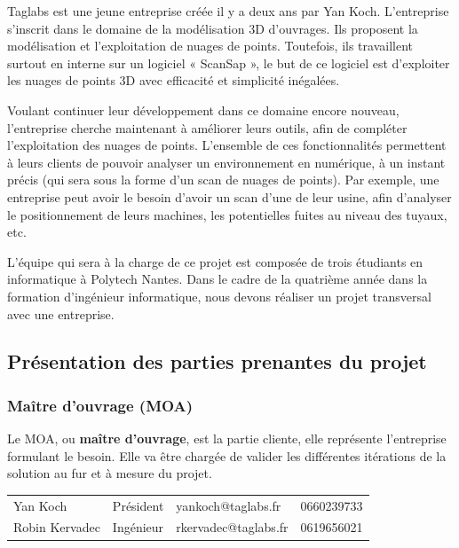 \documentclass[12pt,titlepage,french]{article}
\begin{document}
Taglabs est une jeune entreprise créée il y a deux ans par Yan Koch. L’entreprise s’inscrit dans le domaine de la modélisation 3D d’ouvrages. Ils proposent la modélisation et l’exploitation de nuages de points. Toutefois, ils travaillent surtout en interne sur un logiciel « ScanSap », le but de ce logiciel est d’exploiter les nuages de points 3D avec efficacité et simplicité inégalées.

Voulant continuer leur développement dans ce domaine encore nouveau, l'entreprise cherche maintenant à améliorer leurs outils, afin de compléter l'exploitation des nuages de points. L'ensemble de ces fonctionnalités permettent à leurs clients de pouvoir analyser un environnement en numérique, à un instant précis (qui sera sous la forme d'un scan de nuages de points). Par exemple, une entreprise peut avoir le besoin d'avoir un scan d'une de leur usine, afin d'analyser le positionnement de leurs machines, les potentielles fuites au niveau des tuyaux, etc.

L'équipe qui sera à la charge de ce projet est composée de trois étudiants en informatique à Polytech Nantes. Dans le cadre de la quatrième année dans la formation d'ingénieur informatique, nous devons réaliser un projet transversal avec une entreprise.

\subsection*{Présentation des parties prenantes du projet}

\subsubsection*{Maître d'ouvrage (MOA)}

Le MOA, ou \textbf{maître d'ouvrage}, est la partie cliente, elle représente l'entreprise formulant le besoin.
Elle va être chargée de valider les différentes itérations de la solution au fur et à mesure du projet.\\


\noindent\begin{tabu} to \textwidth {X[c]X[c]X[c]X[c]}\toprule
   &&        &\\\toprule
      Yan Koch&   Président&  yankoch@taglabs.fr&    0660239733\\\midrule
Robin Kervadec&   Ingénieur&rkervadec@taglabs.fr&    0619656021\\\bottomrule
\end{tabu}
\end{document}
